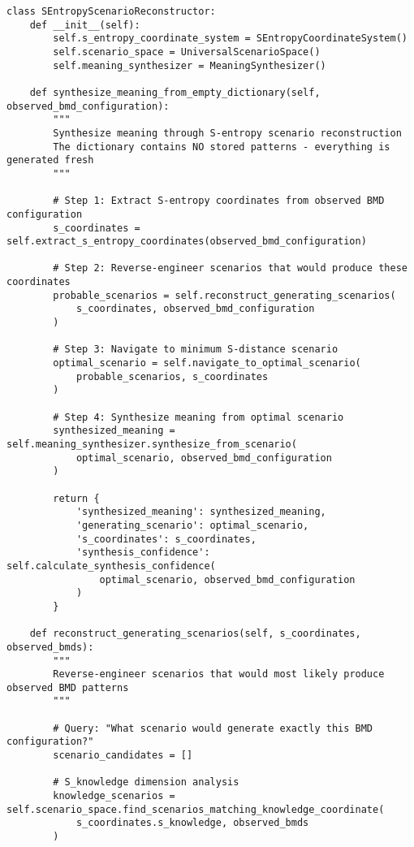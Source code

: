 \documentclass[12pt,a4paper]{article}
\begin{document}
\begin{lstlisting}[style=pythonstyle, caption=S-Entropy Scenario Reconstruction for Meaning Synthesis]
class SEntropyScenarioReconstructor:
    def __init__(self):
        self.s_entropy_coordinate_system = SEntropyCoordinateSystem()
        self.scenario_space = UniversalScenarioSpace()
        self.meaning_synthesizer = MeaningSynthesizer()
        
    def synthesize_meaning_from_empty_dictionary(self, observed_bmd_configuration):
        """
        Synthesize meaning through S-entropy scenario reconstruction
        The dictionary contains NO stored patterns - everything is generated fresh
        """
        
        # Step 1: Extract S-entropy coordinates from observed BMD configuration
        s_coordinates = self.extract_s_entropy_coordinates(observed_bmd_configuration)
        
        # Step 2: Reverse-engineer scenarios that would produce these coordinates
        probable_scenarios = self.reconstruct_generating_scenarios(
            s_coordinates, observed_bmd_configuration
        )
        
        # Step 3: Navigate to minimum S-distance scenario
        optimal_scenario = self.navigate_to_optimal_scenario(
            probable_scenarios, s_coordinates
        )
        
        # Step 4: Synthesize meaning from optimal scenario
        synthesized_meaning = self.meaning_synthesizer.synthesize_from_scenario(
            optimal_scenario, observed_bmd_configuration
        )
        
        return {
            'synthesized_meaning': synthesized_meaning,
            'generating_scenario': optimal_scenario,
            's_coordinates': s_coordinates,
            'synthesis_confidence': self.calculate_synthesis_confidence(
                optimal_scenario, observed_bmd_configuration
            )
        }
    
    def reconstruct_generating_scenarios(self, s_coordinates, observed_bmds):
        """
        Reverse-engineer scenarios that would most likely produce observed BMD patterns
        """
        
        # Query: "What scenario would generate exactly this BMD configuration?"
        scenario_candidates = []
        
        # S_knowledge dimension analysis
        knowledge_scenarios = self.scenario_space.find_scenarios_matching_knowledge_coordinate(
            s_coordinates.s_knowledge, observed_bmds
        )
        

\end{lstlisting}
\end{document}
